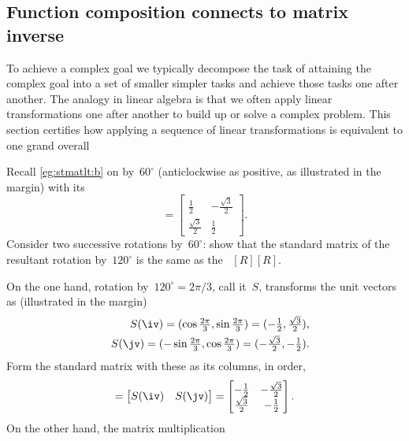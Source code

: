 \subsection{Function composition connects to matrix inverse}

To achieve a complex goal we typically decompose the task of attaining the complex goal into a set of smaller simpler tasks and achieve those tasks one after another.
The analogy in linear algebra is that we often apply linear transformations one after another to build up or solve a complex problem.
This section certifies how applying a sequence of linear transformations is equivalent to one grand overall 

\begin{example} 
Recall \cref{eg:stmatlt:b} on  by~\(60^\circ\) (anticlockwise as positive, as illustrated in the margin) with its 
%
\begin{equation*}
[R]=\begin{bmatrix} \frac12&-\frac{\sqrt3}2
\\\frac{\sqrt3}2&\frac12 \end{bmatrix}.
\end{equation*}
Consider two successive rotations by~\(60^\circ\): show that the standard matrix of the resultant rotation by~\(120^\circ\)  is the same as the ~\([R][R]\).
\begin{solution} 
On the one hand, rotation by~\(120^\circ=2\pi/3\), call it~\(S\), transforms the unit vectors as (illustrated in the margin)
%
\begin{eqnarray*}
&&S(\iv)=(\cos\tfrac{2\pi}3,\sin\tfrac{2\pi}3)
=(-\tfrac12,\tfrac{\sqrt3}2),
\\&&S(\jv)=(-\sin\tfrac{2\pi}3,\cos\tfrac{2\pi}3)
=(-\tfrac{\sqrt3}2,-\tfrac12).
\end{eqnarray*}
Form the standard matrix with these as its columns, in order,
\begin{equation*}
[S]=\begin{bmatrix} S(\iv)&S(\jv) \end{bmatrix}
=\begin{bmatrix} -\frac12&-\frac{\sqrt3}2
\\\frac{\sqrt3}2&-\frac12 \end{bmatrix}.
\end{equation*}
On the other hand, the matrix multiplication

\end{solution}
\end{example}
